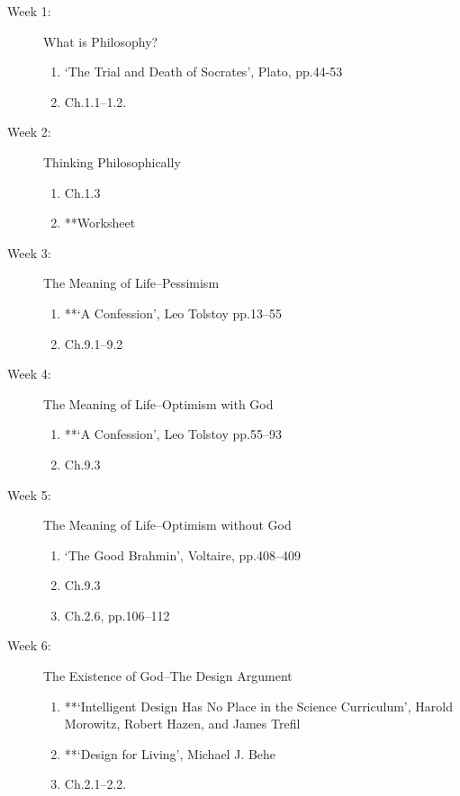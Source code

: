 \documentclass[article,oneside]{memoir}
\begin{document}
\begin{description}

\item[Week 1:] What is Philosophy?
\begin{enumerate}
\item `The Trial and Death of Socrates', Plato, pp.44-53
\item Ch.1.1--1.2.
\end{enumerate}

\item[Week 2:]  Thinking Philosophically
\begin{enumerate}
\item Ch.1.3
\item **Worksheet
\end{enumerate}

\item[Week 3:]  The Meaning of Life--Pessimism
\begin{enumerate}
\item **`A Confession', Leo Tolstoy pp.13--55
\item Ch.9.1--9.2 

\end{enumerate}

\item[Week 4: ] The Meaning of Life--Optimism with God
\begin{enumerate}
\item **`A Confession', Leo Tolstoy pp.55--93
\item Ch.9.3
\end{enumerate}

\item[Week 5: ] The Meaning of Life--Optimism without God
\begin{enumerate}
\item `The Good Brahmin', Voltaire, pp.408--409
\item Ch.9.3
\item Ch.2.6, pp.106--112
\end{enumerate}


\item[Week 6: ] The Existence of God--The Design Argument
\begin{enumerate}
\item **`Intelligent Design Has No Place in the Science Curriculum', Harold Morowitz, Robert Hazen, and James Trefil
 \item **`Design for Living', Michael J. Behe
\item Ch.2.1--2.2. 
 \end{enumerate}
 

\end{description}
\end{document}
